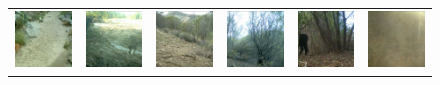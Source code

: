 \begin{figure}[htp!]
\begin{tabularx}{\textwidth}{Y Y Y !{\space} Y Y Y !{\space}}
        \includegraphics{gfx/unconditional-diffusion-sampling-caltech-qual/rgb_5858c0dc-23d2-11e8-a6a3-ec086b02610b.jpg} & \includegraphics{gfx/unconditional-diffusion-sampling-caltech-qual/diffusion_00000.png} & \includegraphics{gfx/unconditional-diffusion-sampling-caltech-qual/rgb_585a640e-23d2-11e8-a6a3-ec086b02610b.jpg} & \includegraphics{gfx/unconditional-diffusion-sampling-caltech-qual/diffusion_00001.png} & \includegraphics{gfx/unconditional-diffusion-sampling-caltech-qual/rgb_585a6486-23d2-11e8-a6a3-ec086b02610b.jpg} & \includegraphics{gfx/unconditional-diffusion-sampling-caltech-qual/diffusion_00002.png} \\

\end{tabularx}
\end{figure}
